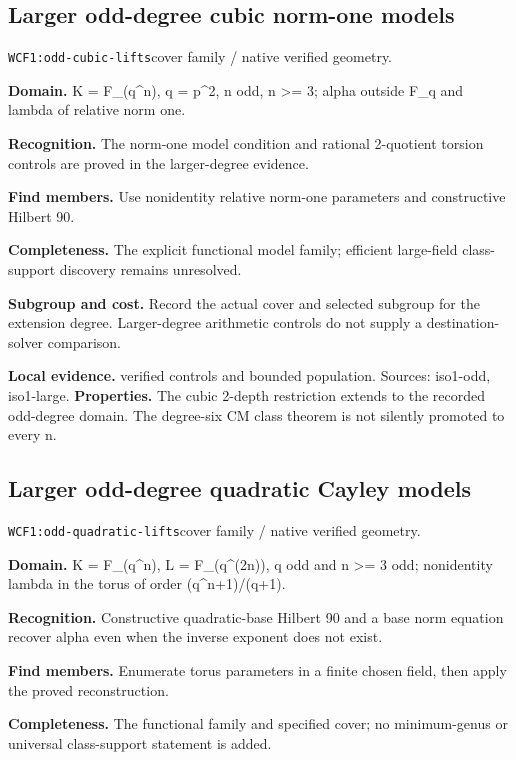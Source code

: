 \documentclass[10pt]{article}
\begin{document}
\subsection{Larger odd-degree cubic norm-one models}
\texttt{WCF1:odd-cubic-lifts}\quad cover family / native verified geometry.\par
\textbf{Domain.} K = F\_(q\textasciicircum{}n), q = p\textasciicircum{}2, n odd, n >= 3; alpha outside F\_q and lambda of relative norm one.\par
\textbf{Recognition.} The norm-one model condition and rational 2-quotient torsion controls are proved in the larger-degree evidence.\par
\textbf{Find members.} Use nonidentity relative norm-one parameters and constructive Hilbert 90.\par
\textbf{Completeness.} The explicit functional model family; efficient large-field class-support discovery remains unresolved.\par
\textbf{Subgroup and cost.} Record the actual cover and selected subgroup for the extension degree. Larger-degree arithmetic controls do not supply a destination-solver comparison.\par
\textbf{Local evidence.} verified controls and bounded population. Sources: iso1-odd, iso1-large.
\textbf{Properties.} The cubic 2-depth restriction extends to the recorded odd-degree domain. The degree-six CM class theorem is not silently promoted to every n.\par
{}\subsection{Larger odd-degree quadratic Cayley models}
\texttt{WCF1:odd-quadratic-lifts}\quad cover family / native verified geometry.\par
\textbf{Domain.} K = F\_(q\textasciicircum{}n), L = F\_(q\textasciicircum{}(2n)), q odd and n >= 3 odd; nonidentity lambda in the torus of order (q\textasciicircum{}n+1)/(q+1).\par
\textbf{Recognition.} Constructive quadratic-base Hilbert 90 and a base norm equation recover alpha even when the inverse exponent does not exist.\par
\textbf{Find members.} Enumerate torus parameters in a finite chosen field, then apply the proved reconstruction.\par
\textbf{Completeness.} The functional family and specified cover; no minimum-genus or universal class-support statement is added.\par
\end{document}
